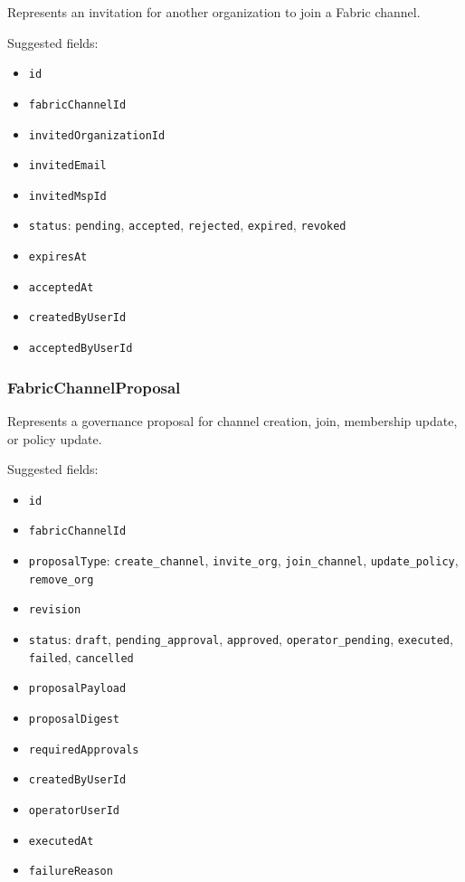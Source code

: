 Represents an invitation for another organization to join a Fabric channel.

Suggested fields:

\begin{itemize}
  \item \texttt{id}
  \item \texttt{fabricChannelId}
  \item \texttt{invitedOrganizationId}
  \item \texttt{invitedEmail}
  \item \texttt{invitedMspId}
  \item \texttt{status}: \texttt{pending}, \texttt{accepted}, \texttt{rejected}, \texttt{expired}, \texttt{revoked}
  \item \texttt{expiresAt}
  \item \texttt{acceptedAt}
  \item \texttt{createdByUserId}
  \item \texttt{acceptedByUserId}
\end{itemize}

\subsubsection{FabricChannelProposal}

Represents a governance proposal for channel creation, join, membership update, or policy update.

Suggested fields:

\begin{itemize}
  \item \texttt{id}
  \item \texttt{fabricChannelId}
  \item \texttt{proposalType}: \texttt{create\_channel}, \texttt{invite\_org}, \texttt{join\_channel}, \texttt{update\_policy}, \texttt{remove\_org}
  \item \texttt{revision}
  \item \texttt{status}: \texttt{draft}, \texttt{pending\_approval}, \texttt{approved}, \texttt{operator\_pending}, \texttt{executed}, \texttt{failed}, \texttt{cancelled}
  \item \texttt{proposalPayload}
  \item \texttt{proposalDigest}
  \item \texttt{requiredApprovals}
  \item \texttt{createdByUserId}
  \item \texttt{operatorUserId}
  \item \texttt{executedAt}
  \item \texttt{failureReason}
\end{itemize}

